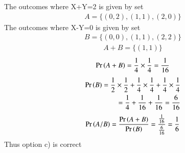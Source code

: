 \documentclass[journal,12pt,twocolumn]{IEEEtran}
\begin{document}
The outcomes where X+Y=2 is given by set\\
\begin{align}
A=\{(0,2),(1,1),(2,0)\}
\end{align}
The outcomes where X-Y=0 is given by set\\
\begin{align}
B=\{(0,0),(1,1),(2,2)\}
\end{align}
\begin{align}
A+B=\{(1,1)\}
\end{align}
\begin{align}
\Pr\left(A+B\right)=\frac{1}{4}\times\frac{1}{4}=\frac{1}{16}
\end{align}
\begin{align}
\Pr\left(B\right)=\frac{1}{2}\times\frac{1}{2}+\frac{1}{4}\times\frac{1}{4}+\frac{1}{4}\times\frac{1}{4}\notag\\
=\frac{1}{4}+\frac{1}{16}+\frac{1}{16}=\frac{6}{16}
\end{align}
\begin{align}
\Pr\left(A/B\right)=\frac{\Pr\left(A+B\right)}{\Pr\left(B\right)}=\frac{\frac{1}{16}}{\frac{6}{16}}=\frac{1}{6}
\end{align}
Thus option c) is correct\\
\end{document}
